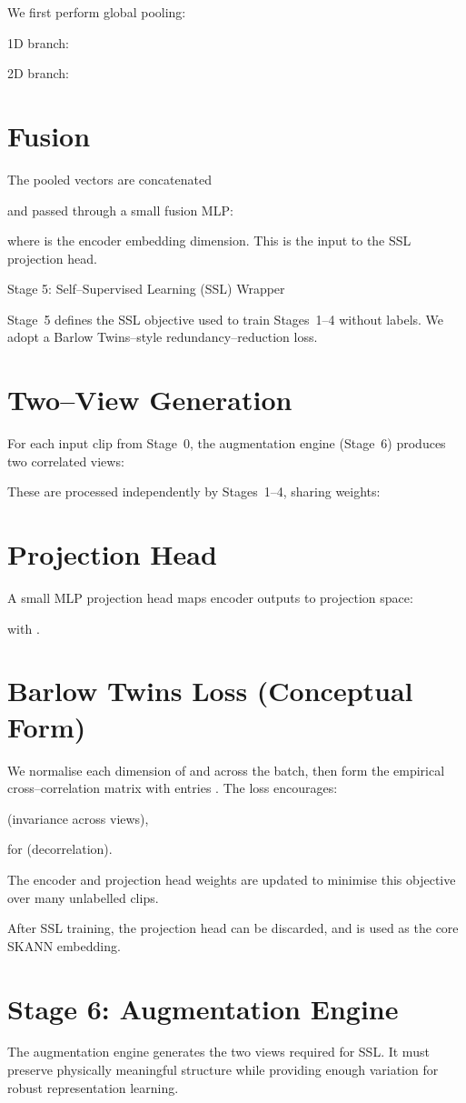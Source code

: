 \documentclass[12pt]{article}
\begin{document}
We first perform global pooling:

1D branch:


2D branch:


\section*{Fusion}
The pooled vectors are concatenated


and passed through a small fusion MLP:


where  is the encoder embedding dimension. This  is the input to the SSL projection head.

Stage 5: Self–Supervised Learning (SSL) Wrapper

Stage 5 defines the SSL objective used to train Stages 1–4 without labels. We adopt a Barlow Twins–style redundancy–reduction loss.

\section*{Two–View Generation}
For each input clip  from Stage 0, the augmentation engine (Stage 6) produces two correlated views:


These are processed independently by Stages 1–4, sharing weights:


\section*{Projection Head}
A small MLP projection head  maps encoder outputs to projection space:


with .

\section*{Barlow Twins Loss (Conceptual Form)}
We normalise each dimension of  and  across the batch, then form the empirical cross–correlation matrix  with entries . The loss encourages:

(invariance across views),

for  (decorrelation).

The encoder and projection head weights are updated to minimise this objective over many unlabelled clips.

After SSL training, the projection head  can be discarded, and  is used as the core SKANN embedding.

\section*{Stage 6: Augmentation Engine}
The augmentation engine generates the two views required for SSL. It must preserve physically meaningful structure while providing enough variation for robust representation learning.
\end{document}
